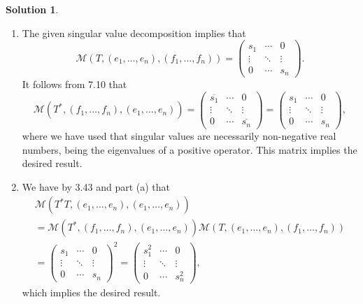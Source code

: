 \documentclass[12pt]{article}
\theoremstyle{definition}
\theoremstyle{exercise}
\theoremstyle{solution}
\newtheorem*{solution}{Solution}
\newcommand{\mat}{\mathcal{M}}
\begin{document}
\begin{solution}
    \begin{enumerate}
        \item The given singular value decomposition implies that
        \[
            \mat(T, (e_1, \ldots, e_n), (f_1, \ldots, f_n)) = \begin{pmatrix}
                s_1 & \cdots & 0 \\
                \vdots & \ddots & \vdots \\
                0 & \cdots & s_n
            \end{pmatrix}.
        \]
        It follows from 7.10 that
        \[
            \mat(T^*, (f_1, \ldots, f_n), (e_1, \ldots, e_n)) = \begin{pmatrix}
                \overline{s_1} & \cdots & 0 \\
                \vdots & \ddots & \vdots \\
                0 & \cdots & \overline{s_n}
            \end{pmatrix}
            =
            \begin{pmatrix}
                s_1 & \cdots & 0 \\
                \vdots & \ddots & \vdots \\
                0 & \cdots & s_n
            \end{pmatrix},
        \]
        where we have used that singular values are necessarily non-negative real numbers, being the eigenvalues of a positive operator. This matrix implies the desired result.

        \item We have by 3.43 and part (a) that
        \begin{multline*}
            \mat(T^* T, (e_1, \ldots, e_n), (e_1, \ldots, e_n)) \\[2mm]
            = \mat(T^*, (f_1, \ldots, f_n), (e_1, \ldots, e_n)) \mat(T, (e_1, \ldots, e_n), (f_1, \ldots, f_n)) \\[2mm]
            = \begin{pmatrix}
                s_1 & \cdots & 0 \\
                \vdots & \ddots & \vdots \\
                0 & \cdots & s_n
            \end{pmatrix}^2
            =
            \begin{pmatrix}
                s_1^2 & \cdots & 0 \\
                \vdots & \ddots & \vdots \\
                0 & \cdots & s_n^2
            \end{pmatrix},
        \end{multline*}
        which implies the desired result.


\end{enumerate}
\end{solution}
\end{document}
